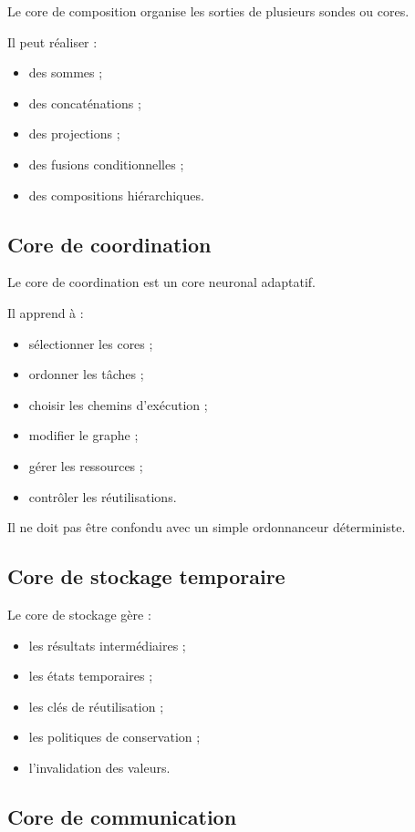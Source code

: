 \documentclass[11pt,a4paper]{article}
\begin{document}
Le core de composition organise les sorties de plusieurs sondes
ou cores.

Il peut réaliser :
\begin{itemize}
  \item des sommes ;
  \item des concaténations ;
  \item des projections ;
  \item des fusions conditionnelles ;
  \item des compositions hiérarchiques.
\end{itemize}

\subsection{Core de coordination}

Le core de coordination est un core neuronal adaptatif.

Il apprend à :
\begin{itemize}
  \item sélectionner les cores ;
  \item ordonner les tâches ;
  \item choisir les chemins d'exécution ;
  \item modifier le graphe ;
  \item gérer les ressources ;
  \item contrôler les réutilisations.
\end{itemize}

Il ne doit pas être confondu avec un simple ordonnanceur déterministe.

\subsection{Core de stockage temporaire}

Le core de stockage gère :
\begin{itemize}
  \item les résultats intermédiaires ;
  \item les états temporaires ;
  \item les clés de réutilisation ;
  \item les politiques de conservation ;
  \item l'invalidation des valeurs.
\end{itemize}

\subsection{Core de communication}
\end{document}
